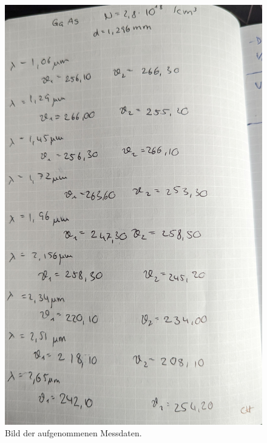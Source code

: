 \begin{figure}[H]
              \centering
              \includegraphics[height=\textheight]{content/v46_pictures/messdaten_4.jpg}
              \caption{Bild der aufgenommenen Messdaten.}
              \label{fig:messdatend}
\end{figure}